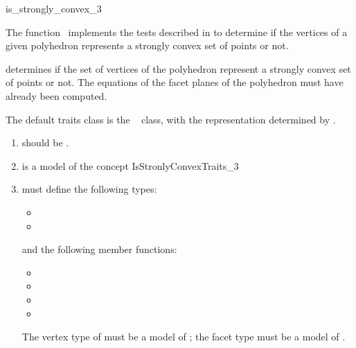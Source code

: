 \begin{ccRefFunction}{is_strongly_convex_3}

\ccDefinition

The function \ccRefName\ implements the tests described in 
\cite{mnssssu-cgpvg-96} to 
determine if the vertices of a given polyhedron represents a strongly convex 
set of points or not.  



{
determines if the set of vertices of the polyhedron  represent
a strongly convex set of points or not.
\ccPrecond%
The equations of the facet planes of the polyhedron must have
already been computed.
}

The default traits class is the \cgal\  class,
with the representation determined by .

\begin{enumerate}
   \item {} should be .
   \item {} is a model of the concept IsStronlyConvexTraits\_3
  \item {} must define the following types:
        \begin{itemize}
          \item {}
          \item {}
        \end{itemize}
        and the following member functions:
        \begin{itemize}
          \item {}
          \item {}
          \item {}
          \item {}
        \end{itemize}
        The vertex type of  must be a model of 
        ;
        the facet type must be a model of .
\end{enumerate}


\ccSeeAlso

 \\
 \\

\end{ccRefFunction}
